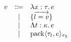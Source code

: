 \documentclass[lualatex,12pt,unicode]{article}
\begin{document}
\pagestyle{empty}

\begin{align*}
    \begin{array}{rcl}
        v
        &\Coloneqq &\lambda x: \tau\ldotp e \\
        &\mid &\{\overrightarrow{l = v}\} \\
        &\mid &\Lambda t: \kappa\ldotp e \\
        &\mid &\mathrm{pack}\langle \tau_t, e\rangle_{\tau_\exists}
    \end{array}
\end{align*}
\end{document}
